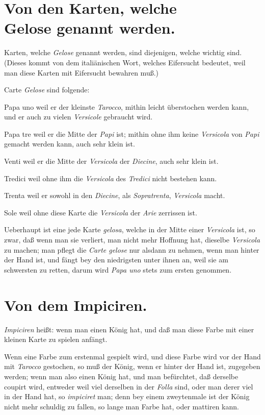 \documentclass[11pt,a6paper,twoside]{article}
\newenvironment{gelose}
                 {\begin{list}
                     {}
                     {\let\makelabel\textsc
                       \setlength{\labelwidth}{2em}
                       \setlength{\parindent}{0.5em}
                       \setlength{\parsep}{0em}
                       \setlength{\topsep}{0pt}
                       \setlength{\labelsep}{0.5em}
                       \setlength{\itemsep}{2pt}
                       \setlength{\leftmargin}{1.5em}
                       \setlength{\itemindent}{1em} %
                     }
                 }
                 {\end{list}}
\begin{document}
\section{Von den Karten, welche \\Gelose genannt werden.}

Karten, welche \textit{Gelose} genannt werden, sind diejenigen, welche wichtig sind. (Dieses kommt von dem italiänischen Wort, welches Eifersucht bedeutet, weil man diese Karten mit Eifersucht bewahren muß.)

Carte \textit{Gelose} sind folgende:
\begin{gelose}
\item[Papa uno] weil er der kleinste \textit{Tarocco}, mithin leicht überstochen werden kann, und er auch zu vielen \textit{Versicole} gebraucht wird.
\item[Papa tre] weil er die Mitte der \textit{Papi} ist; mithin ohne ihm keine \textit{Versicola} von \textit{Papi} gemacht werden kann, auch sehr klein ist.
\item[Venti] weil er die Mitte der \textit{Versicola} der \textit{Diecine}, auch sehr klein ist.
\item[Tredici] weil ohne ihm die \textit{Versicola} des \textit{Tredici} nicht bestehen kann.
\item[Trenta] weil er sowohl in den \textit{Diecine}, als \textit{Sopratrenta}, \textit{Versicola} macht.
\item[Sole] weil ohne diese Karte die \textit{Versicola} der \textit{Arie} zerrissen ist.
\end{gelose}

Ueberhaupt ist eine jede Karte \textit{gelosa}, welche in der Mitte einer \textit{Versicola} ist, so zwar, daß wenn man sie verliert, man nicht mehr Hoffnung hat, dieselbe \textit{Versicola} zu machen; man pflegt die \textit{Carte gelose} nur alsdann zu nehmen, wenn man hinter der Hand ist, und fängt bey den niedrigsten unter ihnen an, weil sie am schwersten zu retten, darum wird \textit{Papa uno} stets zum ersten genommen.


\section{Von dem Impiciren.}

\textit{Impiciren} heißt: wenn man einen König hat, und daß man diese Farbe mit einer kleinen Karte zu spielen anfängt.

Wenn eine Farbe zum erstenmal gespielt wird, und diese Farbe wird vor der Hand mit \textit{Tarocco} gestochen, so muß der König, wenn er hinter der Hand ist, zugegeben werden; wenn man also einen König hat, und man befürchtet, daß derselbe coupirt wird, entweder weil viel derselben in der \textit{Folla} sind, oder man derer viel in der Hand hat, so \textit{impiciret} man; denn bey einem zweytenmale ist der König nicht mehr schuldig zu fallen, so lange man Farbe hat, oder mattiren kann.
\end{document}
